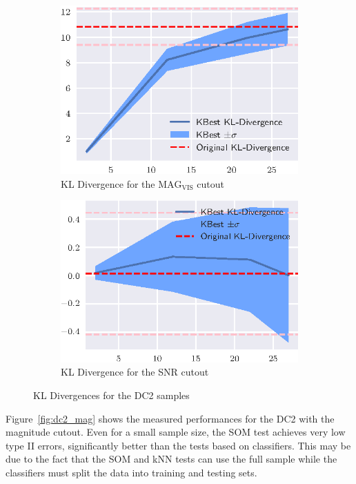 \begin{figure}[htbp]
    \begin{subfigure}[]{0.5\textwidth}
    \includegraphics[width=\textwidth]{images/4_som/divergence/dc2_mag_divergence.eps}
    \caption{KL Divergence for the $\text{MAG}_\text{VIS}$ cutout}
    \end{subfigure}
    \hfill
    \begin{subfigure}[]{0.5\textwidth}
    \includegraphics[width=\textwidth]{images/4_som/divergence/dc2_snr_divergence.eps}
    \caption{KL Divergence for the SNR cutout}
    \end{subfigure}
    \caption{KL Divergences for the DC2 samples}
    \label{fig:divergence_dc2}
\end{figure}

Figure~\ref{fig:dc2_mag} shows the measured performances for the DC2 with the magnitude
cutout. Even for a small sample size, the SOM test achieves very low type II errors, 
significantly better than the tests based on classifiers.
This may be due to the fact that the SOM and kNN
tests can use the full sample while the classifiers must split the data into training and testing sets.


